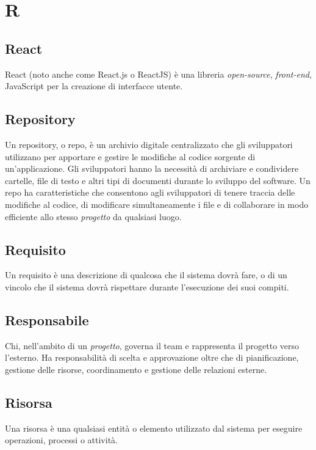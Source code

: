 \chapter{R}

\section{React}
React (noto anche come React.js o ReactJS) è una libreria \emph{open-source}, \emph{front-end}, JavaScript per la creazione di interfacce utente.

\section{Repository}\label{sec:Repo}
Un repository, o repo, è un archivio digitale centralizzato che gli sviluppatori utilizzano per apportare e gestire le modifiche al codice sorgente di un'applicazione. Gli sviluppatori hanno la necessità di archiviare e condividere cartelle, file di testo e altri tipi di documenti durante lo sviluppo del software. Un repo ha caratteristiche che consentono agli sviluppatori di tenere traccia delle modifiche al codice, di modificare simultaneamente i file e di collaborare in modo efficiente allo stesso \emph{progetto} da qualsiasi luogo. 

\section{Requisito}\label{sec:Requisiti}
Un requisito è una descrizione di qualcosa che il sistema dovrà fare, o di un vincolo che il sistema dovrà rispettare durante l’esecuzione dei suoi compiti.

\section{Responsabile}
Chi, nell'ambito di un \emph{progetto}, governa il team e rappresenta il progetto verso l'esterno. Ha responsabilità di scelta e approvazione oltre che di pianificazione, gestione delle risorse, coordinamento e gestione delle relazioni esterne. 

\section{Risorsa}\label{sec:Risorse}
Una risorsa è una qualsiasi entità o elemento utilizzato dal sistema per eseguire operazioni, processi o attività.

